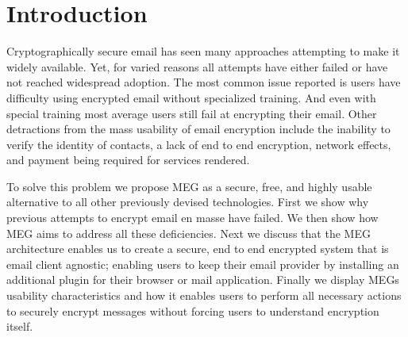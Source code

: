 \documentclass[11pt]{article}
\begin{document}
\section{Introduction}
\par Cryptographically secure email has seen many approaches attempting to make it widely available. Yet, for varied reasons all attempts have either failed or have not reached widespread adoption. The most common issue reported is users have difficulty using encrypted email without specialized training. And even with special training most average users still fail at encrypting their email\cite{whitten1999johnny}. Other detractions from the mass usability of email encryption include the inability to verify the identity of contacts, a lack of end to end encryption, network effects, and payment being required for services rendered.
\par To solve this problem we propose MEG as a secure, free, and highly usable alternative to all other previously devised technologies. First we show why previous attempts to encrypt email en masse have failed. We then show how MEG aims to address all these deficiencies. Next we discuss that the MEG architecture enables us to create a secure, end to end encrypted system that is email client agnostic; enabling users to keep their email provider by installing an additional plugin for their browser or mail application. Finally we display MEGs usability characteristics and how it enables users to perform all necessary actions to securely encrypt messages without forcing users to understand encryption itself.
\end{document}
